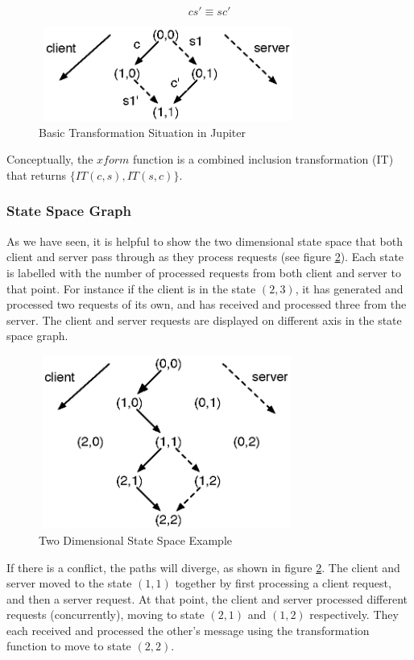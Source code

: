 $$ c s' \equiv s c' $$

\begin{figure}[htb]
 \centering
 \includegraphics[width=8.5cm,height=3.1cm]{../../images/concepts_jupiter1.eps}
 \caption{Basic Transformation Situation in Jupiter}
 \label{fig:concepts.basic}
\end{figure}

Conceptually, the $xform$ function is a combined inclusion transformation (IT) that returns $\{IT(c,s),IT(s,c)\}$.

\subsubsection{State Space Graph}
As we have seen, it is helpful to show the two dimensional state space that both client and server pass through as they process requests (see figure \ref{fig:concepts.statespace}). Each state is labelled with the number of processed requests from both client and server to that point. For instance if the client is in the state $(2,3)$, it has generated and processed two requests of its own, and has received and processed three from the server. The client and server requests are displayed on different axis in the state space graph.

\begin{figure}[htb]
 \centering
 \includegraphics[width=8.4cm,height=5.7cm]{../../images/concepts_statespace.eps}
 \caption{Two Dimensional State Space Example}
 \label{fig:concepts.statespace}
\end{figure}

If there is a conflict, the paths will diverge, as shown in figure \ref{fig:concepts.statespace}. The client and server moved to the state $(1,1)$ together by first processing a client request, and then a server request. At that point, the client and server processed different requests (concurrently), moving to state $(2,1)$ and $(1,2)$ respectively. They each received and processed the other's message using the transformation function to move to state $(2,2)$.

